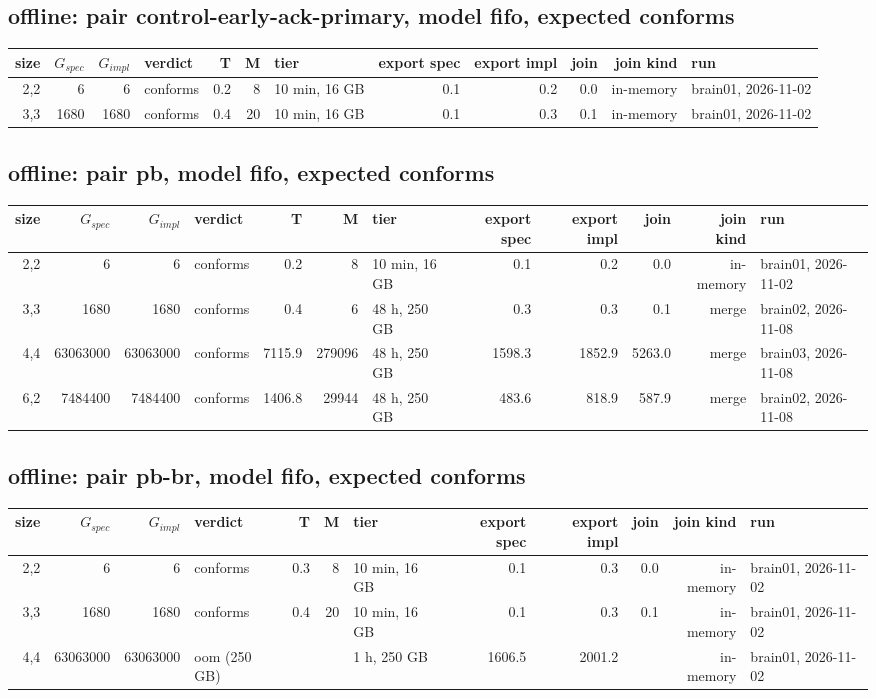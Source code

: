 \documentclass[10pt]{article}
\begin{document}
\subsection*{offline: pair \textsf{control-early-ack-primary}, model fifo, expected conforms}
\begin{longtable}{@{}rrrlrrlrrrrl@{}}
\toprule
size & $G_{\mathit{spec}}$ & $G_{\mathit{impl}}$ & verdict & T & M & tier & export spec & export impl & join & join kind & run \\
\midrule
\endhead
\color{red} 2,2 & 6 & 6 & conforms & 0.2 & 8 & 10 min, 16 GB & 0.1 & 0.2 & 0.0 & in-memory & brain01, 2026-11-02 \\
\color{red} 3,3 & 1680 & 1680 & conforms & 0.4 & 20 & 10 min, 16 GB & 0.1 & 0.3 & 0.1 & in-memory & brain01, 2026-11-02 \\
\bottomrule
\end{longtable}
\subsection*{offline: pair \textsf{pb}, model fifo, expected conforms}
\begin{longtable}{@{}rrrlrrlrrrrl@{}}
\toprule
size & $G_{\mathit{spec}}$ & $G_{\mathit{impl}}$ & verdict & T & M & tier & export spec & export impl & join & join kind & run \\
\midrule
\endhead
\color{red} 2,2 & 6 & 6 & conforms & 0.2 & 8 & 10 min, 16 GB & 0.1 & 0.2 & 0.0 & in-memory & brain01, 2026-11-02 \\
\color{blue} 3,3 & 1680 & 1680 & conforms & 0.4 & 6 & 48 h, 250 GB & 0.3 & 0.3 & 0.1 & merge & brain02, 2026-11-08 \\
\color{blue} 4,4 & 63063000 & 63063000 & conforms & 7115.9 & 279096 & 48 h, 250 GB & 1598.3 & 1852.9 & 5263.0 & merge & brain03, 2026-11-08 \\
\color{blue} 6,2 & 7484400 & 7484400 & conforms & 1406.8 & 29944 & 48 h, 250 GB & 483.6 & 818.9 & 587.9 & merge & brain02, 2026-11-08 \\
\bottomrule
\end{longtable}
\subsection*{offline: pair \textsf{pb-br}, model fifo, expected conforms}
\begin{longtable}{@{}rrrlrrlrrrrl@{}}
\toprule
size & $G_{\mathit{spec}}$ & $G_{\mathit{impl}}$ & verdict & T & M & tier & export spec & export impl & join & join kind & run \\
\midrule
\endhead
\color{red} 2,2 & 6 & 6 & conforms & 0.3 & 8 & 10 min, 16 GB & 0.1 & 0.3 & 0.0 & in-memory & brain01, 2026-11-02 \\
\color{red} 3,3 & 1680 & 1680 & conforms & 0.4 & 20 & 10 min, 16 GB & 0.1 & 0.3 & 0.1 & in-memory & brain01, 2026-11-02 \\
\color{red} 4,4 & 63063000 & 63063000 & oom (250 GB) &  &  & 1 h, 250 GB & 1606.5 & 2001.2 &  & in-memory & brain01, 2026-11-02 \\
\bottomrule
\end{longtable}
\end{document}
